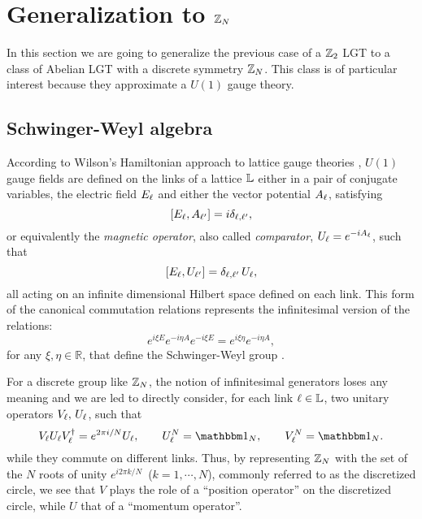 \section{Generalization to \texorpdfstring{$\mathbb{Z}_N$}{Z\_N}}%
\label{sec:generalization_to_zn}
In this section we are going to generalize the previous case of a $\mathbb{Z}_2$ LGT to a class of Abelian LGT with a discrete symmetry $\mathbb{Z}_N$.
This class is of particular interest because they approximate a $U(1)$ gauge theory.



%
%
\subsection{Schwinger-Weyl algebra}%
\label{sub:schwinger_weyl_algebra}

According to Wilson's Hamiltonian approach to lattice gauge theories \cite{wilson1974confinement}, $U(1)$ gauge fields are defined on the links of a lattice $\mathbb{L}$  either in a pair of conjugate variables, the electric field  $E_\ell$ and either the vector potential $A_\ell$, satisfying
\begin{equation}
    \comm{E_\link}{A_{\link^{\prime}}}  = i \delta_{\link , \link^{\prime} },
\end{equation}
or equivalently the \emph{magnetic operator}, also called \emph{comparator},
$U_\ell = e^{-i A_{\ell} }$, such that
\begin{equation}
    \comm{E_\link}{U_{\link^{\prime}}} =  \delta_{\link , \link^{\prime} } \, U_{\link},
\end{equation}
all acting on an infinite dimensional Hilbert space defined on each link.
This form of the canonical commutation relations represents the infinitesimal version of the relations:
\begin{equation}
     e^{i\xi E} e^{-i\eta A } e^{-i\xi E} = e^{i\xi \eta} e^ {-i\eta A },
\end{equation}
for any $\xi, \eta \in \mathbb{R}$,
that define the Schwinger-Weyl group \cite{notarnicola2015discrete, ercolessi2018znmodels, schwinger1960unitary}.

For a discrete group like $\mathbb{Z}_N$, the notion of infinitesimal generators loses any meaning and we are led to directly consider, for each link $\ell \in \mathbb{L}$, two unitary operators
$V_\ell, \, U_\ell$, such that \cite{schwinger1960unitary, schwinger2001symbolism}
\begin{equation}
    V_\link U_\link V_\link^{\dagger}=e^{2\pi i/N}U_\link, \qquad
    U_\link^N=\identity_N, \qquad
    V_\link^N=\identity_N.
    \label{eq:schwinger_weyl_algebra}
\end{equation}
while they commute on different links.
Thus, by representing $\mathbb{Z}_N$  with the set of the $N$ roots of unity $e^{i 2 \pi k/N}$\, ($k=1, \cdots, N$), commonly referred to as the discretized circle,
we see that $V$ plays the role of a ``position operator'' on the discretized circle, while $U$ that of a ``momentum operator''.


